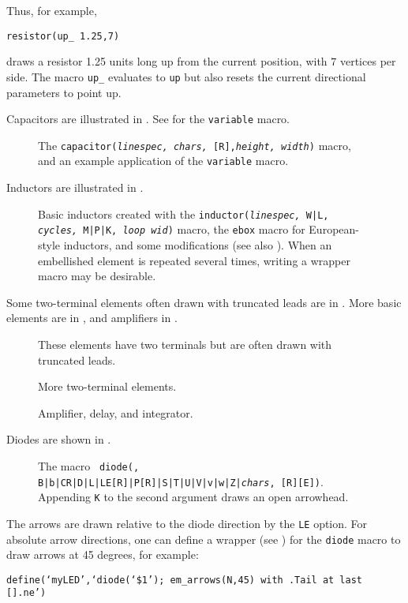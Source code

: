 Thus, for example,
\par
{\tt resistor(up\_ 1.25,7)}
\par
\noindent%
draws a resistor 1.25 units long up from the current position, with $7$
vertices per side.
The macro {\tt up\_} evaluates to {\tt up} but also resets the current
directional parameters to point up.

Capacitors are illustrated in .
See  for the {\tt variable} macro.
\begin{figure}[H]
   
   \caption{The {\tt capacitor({\sl linespec, chars,} [R],{\sl height, width})}
      macro, and an example application of the {\tt variable} macro.}
   \label{Capacitors}
    \end{figure}

Inductors are illustrated in .
\begin{figure}[H]
   
   \caption{Basic inductors created with the
    {\tt inductor({\sl linespec,} W|L, {\sl cycles,} M|P|K, {\sl loop wid})}
    macro, the {\tt ebox} macro for European-style inductors, and some
    modifications (see also ).
    When an embellished element is repeated several times,
    writing a wrapper macro may be desirable.}
   \label{Inductors}
    \end{figure}

Some two-terminal elements often drawn with truncated leads are in
.
More basic elements are in , and amplifiers in .
\begin{figure}[H]
   
   \caption{These elements have two terminals but are often drawn
     with truncated leads.}
   \label{heaterMan}
    \end{figure}
\begin{figure}[H]
   
   \caption{More two-terminal elements.}
   \label{MoreTable}
    \end{figure}
\begin{figure}[H]
\vspace*{-\baselineskip}
   
   \caption{Amplifier, delay, and integrator.}
   \label{AmpTable}
   \end{figure}

Diodes are shown in .
\begin{figure}[H]
   
   \caption{The macro {\tt
     diode(\linespec, B|b|CR|D|L|LE[R]|P[R]|S|T|U|V|v|w|Z|{\sl chars}, [R][E])}.
      Appending {\tt K} to the second argument draws an open arrowhead.}
   \label{Diodes}
   \end{figure}
The arrows are drawn relative to the diode direction by the {\tt LE}
option. For absolute arrow directions, one can
define a wrapper (see ) for the {\tt diode} macro to draw arrows
at 45 degrees, for example:
\par
{\tt define(`myLED',`diode(`\$1'); em\_arrows(N,45)
 with .Tail at last [].ne')}

